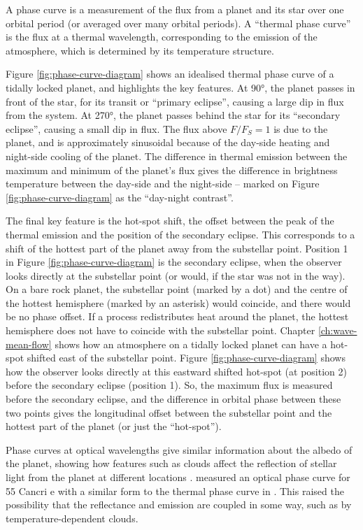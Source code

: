 A phase curve is a measurement of the flux from a planet and its star over one orbital period (or averaged over many orbital periods). A ``thermal phase curve'' is the flux at a thermal wavelength, corresponding to the emission of the atmosphere, which is determined by its temperature structure.

Figure \ref{fig:phase-curve-diagram} shows an idealised thermal phase curve of a tidally locked planet, and highlights the key features. At \ang{90}, the planet passes in front of the star, for its transit or ``primary eclipse'', causing a large dip in flux from the system. At \ang{270}, the planet passes behind the star for its ``secondary eclipse'', causing a small dip in flux. The flux above $F/F_{S}=1$ is due to the planet, and is approximately sinusoidal because of the day-side heating and night-side cooling of the planet. The difference in thermal emission between the maximum and minimum of the planet's flux gives the difference in brightness temperature between the day-side and the night-side -- marked on Figure \ref{fig:phase-curve-diagram} as the ``day-night contrast''.

The final key feature is the hot-spot shift, the offset between the peak of the thermal emission and the position of the secondary eclipse. This corresponds to a shift of the hottest part of the planet away from the substellar point. Position 1 in Figure \ref{fig:phase-curve-diagram} is the secondary eclipse, when the observer looks directly at the substellar point (or would, if the star was not in the way). On a bare rock planet, the substellar point (marked by a dot) and the centre of the hottest hemisphere (marked by an asterisk) would coincide, and there would be no phase offset. If a process redistributes heat around the planet, the hottest hemisphere does not have to coincide with the substellar point. Chapter \ref{ch:wave-mean-flow} shows how an atmosphere on a tidally locked planet can have a hot-spot shifted east of the substellar point. Figure \ref{fig:phase-curve-diagram} shows how the observer looks directly at this eastward shifted hot-spot (at position 2) before the secondary eclipse (position 1). So, the maximum flux is measured before the secondary eclipse, and the difference in orbital phase between these two points gives the longitudinal offset between the substellar point and the hottest part of the planet (or just the ``hot-spot'').

Phase curves at optical wavelengths give similar information about the albedo of the planet, showing how features such as clouds affect the reflection of stellar light from the planet at different locations \citep{parmentier2016transitions}. \citet{dragomir2012most} measured an optical phase curve for 55 Cancri e with a similar form to the thermal phase curve in \citet{demory201655cnce}. This raised the possibility that the reflectance and emission are coupled in some way, such as by temperature-dependent clouds.

